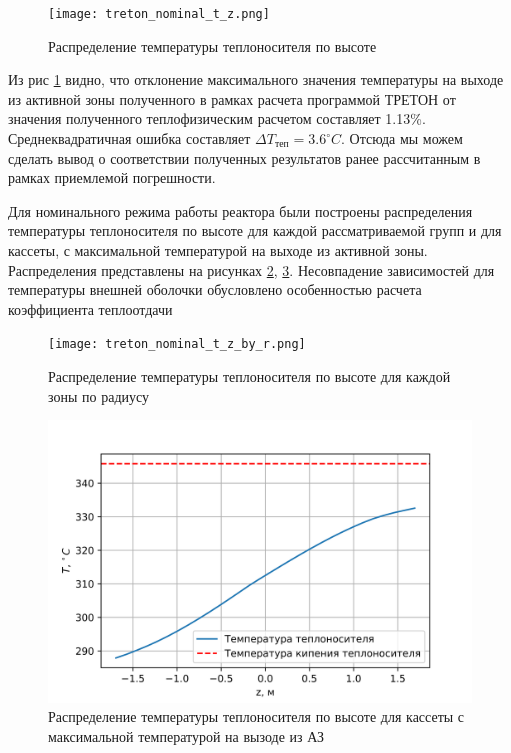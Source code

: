 \begin{figure}[H]
	\begin{center}
		\texttt{[image: treton\_nominal\_t\_z.png]}
		\caption{Распределение температуры теплоносителя по высоте}
		\label{pic:treton-t-tepl-compare-teplofiz} %
	\end{center}
\end{figure}

Из рис \ref{pic:treton-t-tepl-compare-teplofiz} видно, что отклонение максимального значения температуры на выходе из активной зоны полученного в рамках расчета программой ТРЕТОН от значения полученного теплофизическим расчетом составляет 1.13\%. Среднеквадратичная ошибка составляет $\Delta {T_{\text{теп}}} = 3.6 ^\circ C$. Отсюда мы можем сделать вывод о соответствии полученных результатов ранее рассчитанным в рамках приемлемой погрешности.

Для номинального режима работы реактора были построены распределения температуры теплоносителя по высоте для каждой рассматриваемой групп и для кассеты, с максимальной температурой на выходе из активной зоны. Распределения представлены на рисунках \ref{pic:treton-t-tepl-nominal-by-r}, \ref{pic:treton-t-tepl-nominal-max}. Несовпадение зависимостей для температуры внешней оболочки обусловлено особенностью расчета коэффициента теплоотдачи

\begin{figure}[H]
	\begin{center}
		\texttt{[image: treton\_nominal\_t\_z\_by\_r.png]}
		\caption{Распределение температуры теплоносителя по высоте для каждой зоны по радиусу}
		\label{pic:treton-t-tepl-nominal-by-r} %
	\end{center}
\end{figure}

\begin{figure}[H]
	\begin{center}
		\includegraphics{treton_nominal_t_z_max.png}
		\caption{Распределение температуры теплоносителя по высоте для кассеты с максимальной температурой на вызоде из АЗ}
		\label{pic:treton-t-tepl-nominal-max} %
	\end{center}
\end{figure}

